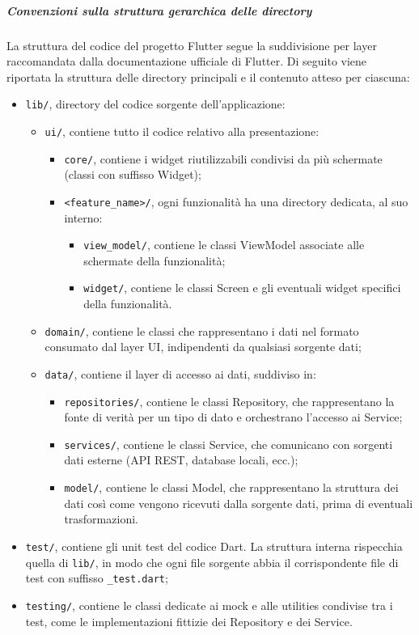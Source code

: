 \documentclass[a4paper,12pt]{article}
\begin{document}
\subparagraph{Convenzioni sulla struttura gerarchica delle directory} \label{subpar:convenzioni-gerarchia-dir-fe}
La struttura del codice del progetto Flutter segue la suddivisione per layer raccomandata dalla documentazione ufficiale di Flutter. 
Di seguito viene riportata la struttura delle directory principali e il contenuto atteso per ciascuna:
\begin{itemize}
    \item \texttt{lib/}, directory del codice sorgente dell'applicazione:
    \begin{itemize}
        \item \texttt{ui/}, contiene tutto il codice relativo alla presentazione:
        \begin{itemize}
            \item \texttt{core/}, contiene i widget riutilizzabili condivisi da più schermate (classi con suffisso Widget);
            \item \texttt{<feature\_name>/}, ogni funzionalità ha una directory dedicata, al suo interno:
            \begin{itemize}
                \item \texttt{view\_model/}, contiene le classi ViewModel associate alle schermate della funzionalità;
                \item \texttt{widget/}, contiene le classi Screen e gli eventuali widget specifici della funzionalità.
            \end{itemize}
        \end{itemize}
        \item \texttt{domain/}, contiene le classi che rappresentano i dati nel formato consumato dal layer UI, indipendenti da qualsiasi sorgente dati;
        \item \texttt{data/}, contiene il layer di accesso ai dati, suddiviso in:
        \begin{itemize}
            \item \texttt{repositories/}, contiene le classi Repository, che rappresentano la fonte di verità per un tipo di dato e orchestrano l'accesso ai Service;
            \item \texttt{services/}, contiene le classi Service, che comunicano con sorgenti dati esterne (API REST, database locali, ecc.);
            \item \texttt{model/}, contiene le classi Model, che rappresentano la struttura dei dati così come vengono ricevuti dalla sorgente dati, prima di eventuali trasformazioni.
        \end{itemize}
    \end{itemize}
    \item \texttt{test/}, contiene gli unit test del codice Dart. La struttura interna rispecchia quella di \texttt{lib/}, in modo che ogni file sorgente abbia il corrispondente file di test con suffisso \texttt{\_test.dart};
    \item \texttt{testing/}, contiene le classi dedicate ai mock e alle utilities condivise tra i test, come le implementazioni fittizie dei Repository e dei Service.
\end{itemize}
\end{document}
